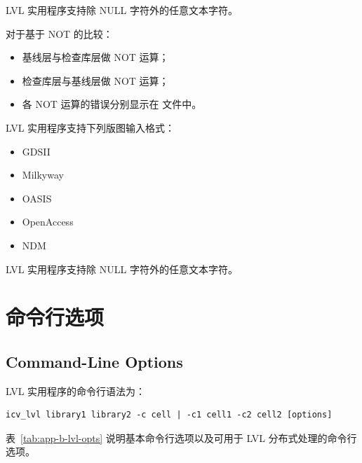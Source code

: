 \begin{noteBox}
LVL 实用程序支持除 NULL 字符外的任意文本字符。
\end{noteBox}

对于基于 NOT 的比较：
\begin{itemize}
  \item 基线层与检查库层做 NOT 运算；
  \item 检查库层与基线层做 NOT 运算；
  \item 各 NOT 运算的错误分别显示在  文件中。
\end{itemize}

LVL 实用程序支持下列版图输入格式：
\begin{itemize}
  \item GDSII
  \item Milkyway
  \item OASIS
  \item OpenAccess
  \item NDM
\end{itemize}

\begin{noteBox}
LVL 实用程序支持除 NULL 字符外的任意文本字符。
\end{noteBox}

\section{命令行选项}
\subsection*{Command-Line Options}

LVL 实用程序的命令行语法为：

\begin{lstlisting}
icv_lvl library1 library2 -c cell | -c1 cell1 -c2 cell2 [options]
\end{lstlisting}

表~\ref{tab:app-b-lvl-opts} 说明基本命令行选项以及可用于 LVL 分布式处理的命令行选项。

